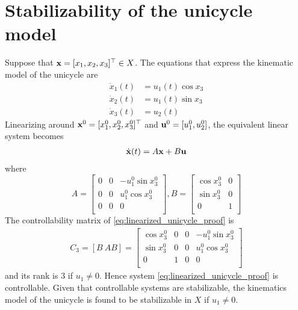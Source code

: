 \section{Stabilizability of the unicycle model}
\label{proof:stabilizability_unicycle}

Suppose that $\bm{\mathbf{x}} = [x_1, x_2, x_3]^{\top} \in X$.
The equations that express the kinematic model of the unicycle are
\begin{align}
  \dot{x}_1(t)       &= u_1(t) \cos x_3 \\
  \dot{x}_2(t)       &= u_1(t) \sin x_3 \\
  \dot{x}_3(t)       &= u_2(t)
\end{align}
Linearizing around $\bm{\mathbf{x}}^0 = [x_1^0, x_2^0, x_3^0]^{\top}$ and
$\bm{\mathbf{u}}^0 = [u_1^0, u_2^0]$, the equivalent linear system becomes
\begin{align}
  \dot{\bm{\mathbf{x}}}(t)= A \bm{\mathbf{x}} + B \bm{\mathbf{u}}
  \label{eq:linearized_unicycle_proof}
\end{align}
where
\begin{equation}
  A =
  \begin{bmatrix}
    0 & 0 & -u_1^0 \sin x_3^0 \\
    0 & 0 & u_1^0 \cos x_3^0 \\
    0 & 0 & 0\\
  \end{bmatrix},
  B =
  \begin{bmatrix}
    \cos x_3^0 & 0 \\
    \sin x_3^0 & 0 \\
    0 & 1 \\
  \end{bmatrix}
\end{equation}
The controllability matrix of \eqref{eq:linearized_unicycle_proof} is
\begin{align}
  C_3 = [B\ AB] =
  \begin{bmatrix}
    \cos x_3^0 & 0 & 0 & -u_1^0 \sin x_3^0 \\
    \sin x_3^0 & 0 & 0 & u_1^0 \cos x_3^0 \\
    0 & 1 & 0 & 0\\
  \end{bmatrix}
\end{align}
and its rank is 3 if $u_1 \neq 0$. Hence
system \eqref{eq:linearized_unicycle_proof} is controllable. Given that
controllable systems are stabilizable, the kinematics model of the unicycle is
found to be stabilizable in $X$ if $u_1 \neq 0$.
